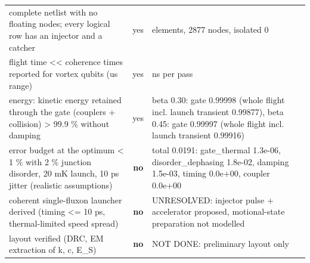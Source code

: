 \documentclass[10pt,twocolumn,letterpaper]{article}
\begin{document}
\begin{table}[t]
\begin{tabularx}{\textwidth}{@{}>{\raggedright\arraybackslash}X c >{\raggedright\arraybackslash}p{}@{}}
complete netlist with no floating nodes; every logical row has an injector and a catcher & yes & 8082 elements, 2877 nodes, isolated 0\\
flight time \textless{}\textless{} coherence times reported for vortex qubits (us range) & yes & 1.01 ns per pass\\
energy: kinetic energy retained through the gate (couplers + collision) \textgreater{} 99.9 \% without damping & yes & beta 0.30: gate 0.99998 (whole flight incl. launch transient 0.99877), beta 0.45: gate 0.99997 (whole flight incl. launch transient 0.99916)\\
error budget at the optimum \textless{} 1 \% with 2 \% junction disorder, 20 mK launch, 10 ps jitter (realistic assumptions) & \textbf{no} & total 0.0191: gate\_thermal 1.3e-06, disorder\_dephasing 1.8e-02, damping 1.5e-03, timing 0.0e+00, coupler 0.0e+00\\
coherent single-fluxon launcher derived (timing \textless{}= 10 ps, thermal-limited speed spread) & \textbf{no} & UNRESOLVED: injector pulse + accelerator proposed, motional-state preparation not modelled\\
layout verified (DRC, EM extraction of k, c, E\_S) & \textbf{no} & NOT DONE: preliminary layout only\\
\bottomrule
\end{tabularx}
\end{table}
\end{document}
